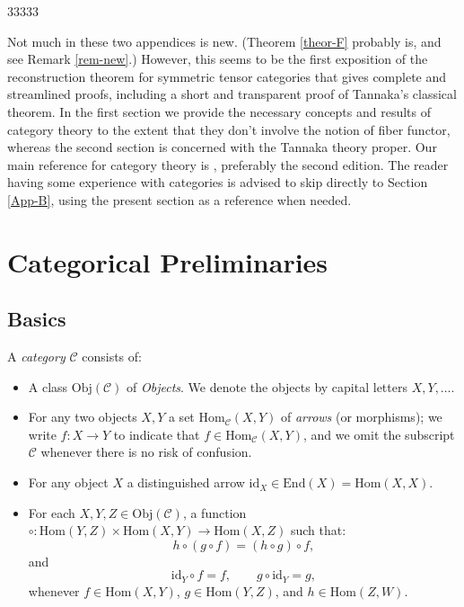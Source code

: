 \documentclass[12pt]{article}
\newcommand{\ip}[2]{\langle #1,#2\rangle}
\theoremstyle{definition}
\theoremstyle{definition}
\theoremstyle{remark}
\newcommand{\restr}{\upharpoonright}
\newcommand{\oli}{{\overline{\imath}}}
\newcommand{\DS}{\displaystyle}
\newcommand{\Obj}{\mathrm{Obj}}
\newcommand{\op}{{\mbox{\scriptsize op}}}
\newcommand{\impl}{\Rightarrow}
\newcommand{\ve}{\varepsilon}
\def\2#1{{\mathcal #1}}
\newcommand{\Hom}{\mathrm{Hom}}
\newcommand{\End}{\mathrm{End}}
\newcommand{\rarr}{\rightarrow}
\def\id{\mathrm{id}}
\begin{document}
\def\implies{\Rightarrow}
\renewcommand{\restr}{\upharpoonright}
\renewcommand{\rarr}{\rightarrow}
\newcommand{\lrarr}{\longrightarrow}
\renewcommand{\impl}{\Rightarrow}
\renewcommand{\oli}{{\overline{\imath}}}
\renewcommand{\ve}{\varepsilon}
\renewcommand{\op}{{\mbox{\scriptsize op}}}

\renewcommand{\DS}{\displaystyle}

\def\ip#1#2{{(\,#1\, , \, #2\,)}}
\def\m#1{{\vert #1 \vert}} \def\n#1{\Vert #1 \Vert}
\def\prf{\noindent \emph{Proof.\ }}

 33333

\vspace{2em} \noindent Not much in these two appendices
is new. (Theorem \ref{theor-F} probably is, and see
Remark \ref{rem-new}.) However, this seems to be the
first exposition of the reconstruction theorem for
symmetric tensor categories that gives complete and
streamlined proofs, including a short and transparent
proof of Tannaka's classical theorem. In the first
section we provide the necessary concepts and results
of category theory to the extent that they don't
involve the notion of fiber functor, whereas the second
section is concerned with the Tannaka theory
proper. Our main reference for category theory is
\cite{cwm}, preferably the second edition. The reader
having some experience with categories is advised to
skip directly to Section \ref{App-B}, using the present
section as a reference when needed.


\section{Categorical Preliminaries} \label{cats} \label{app-A}

\subsection{Basics}
\bdefin \label{def-cat} 
A \emph{category} $\2C$ consists of:
\begin{itemize}
\item A class $\Obj (\2C )$ of \emph{Objects}.  We
  denote the objects by capital letters $X,Y,\ldots$.
\item For any two objects $X,Y$ a set $\Hom_\2C(X,Y)$
  of \emph{arrows} (or morphisms); we write $f:X\to Y$
  to indicate that $f\in \Hom_\2C(X,Y)$, and we omit
  the subscript $\2C$ whenever there is no risk of
  confusion.
\item For any object $X$ a distinguished arrow $\id _X\in \End (X)=\Hom(X,X)$.
\item For each $X,Y,Z\in \Obj (\2C )$, a function
  $\circ :\Hom(Y,Z)\times \Hom(X,Y)\to \Hom (X,Z)$ such
  that:
  \[ h\circ (g\circ f)=(h\circ g)\circ f ,\] and
  \[ \id _Y\circ f=f ,\qquad g\circ \id _Y=g ,\] whenever $f\in \Hom
  (X,Y)$, $g\in \Hom (Y,Z)$, and $h\in \Hom (Z,W)$.
\end{itemize} \edefin
\end{document}
